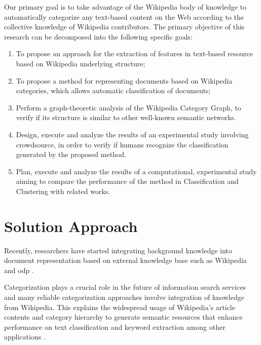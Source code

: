 Our primary goal is to take advantage of the Wikipedia body of knowledge to automatically categorize any text-based content on the Web according to the collective knowledge of Wikipedia contributors.
The primary objective of this research can be decomposed into the following specific goals:



\begin{enumerate}[i]
\item  To propose an approach for the extraction of features in text-based resource based on Wikipedia underlying structure;

\item To propose a method for representing  documents based on Wikipedia categories, which allows automatic classification of documents;

\item Perform a graph-theoretic analysis of the Wikipedia Category Graph, to verify if its structure is similar to other well-known semantic networks.

\item Design, execute and analyze the results of an experimental study involving crowdsource, in order to verify if humans recognize the classification 
generated by the proposed method.

\item Plan, execute and analyze the results of a computational, experimental study aiming to compare the performance of the method in Classification and Clustering with related works.

\end{enumerate}

\section{\hspace*{3pt}Solution Approach}

Recently, researchers have started integrating background knowledge into document representation based on external knowledge base such as Wikipedia and \gls{odp} \cite{rafi2012content}.

Categorization plays a crucial role in the future of information search services and many reliable categorization approaches involve integration of knowledge from Wikipedia. This explains the widespread usage of Wikipedia’s article contents and category hierarchy to generate semantic resources that enhance performance on text classification and keyword extraction among other applications \cite{gantner2009automatic}. 

